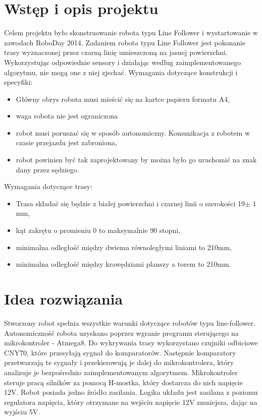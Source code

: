 \documentclass[11pt,a4paper]{article}
\begin{document}
\section{Wstęp i opis projektu}
Celem projektu było skonstruowanie robota typu Line Follower i wystartowanie w zawodach RoboDay 2014.
Zadaniem robota typu Line Follower jest pokonanie trasy wyznaczonej przez czarną linię umieszczoną na jasnej powierzchni. Wykorzystując odpowiednie sensory i działając według zaimplementowanego algorytmu, nie mogą one z niej zjechać.
\newline Wymagania dotyczące konstrukcji i specyfiki:
\begin{itemize}
  \item Główny obrys robota musi mieścić się na kartce papieru formatu A4,
  \item waga robota nie jest ograniczona
  \item robot musi poruszać się w sposób autonomiczny. Komunikacja z robotem w czasie przejazdu jest zabroniona,
  \item robot powinien być tak zaprojektowany by można było go uruchomić na znak dany przez sędziego.
\end{itemize}
Wymagania dotyczące trasy:
\begin{itemize}
  \item Trasa składać się będzie z białej powierzchni i czarnej linii o szerokości 19$\pm$ 1 mm,
  \item kąt zakrętu o promieniu 0 to maksymalnie 90 stopni,
  \item minimalna odległość między dwiema równoległymi liniami to 210mm,
  \item minimalna odległość między krawędziami planszy a torem to 210mm.
\end{itemize}
\section{Idea rozwiązania}
Stworzony robot spełnia wszystkie warunki dotyczące robotów typu line-follower.
Autonomiczność robota uzyskano poprzez wgranie programu sterującego na mikrokontroler - Atmega8. 
Do wykrywania trasy wykorzystano czujniki odbiciowe CNY70, które przesyłają sygnał do komparatorów.
Następnie komparatory przetwarzają te sygnały i przekierowują je dalej do mikrokontrolera, który analizuje je bezpośrednio zaimplementowanym algorytmem. 
Mikrokontroler steruje pracą silników za pomocą H-mostka, który dostarcza do nich napięcie 12V. Robot posiada jedno źródło zasilania. 
Logika układu jest zasilana z poziomu regulatora napięcia, który otrzymane na wejściu napięcie 12V zmniejsza, dając na wyjściu 5V. 
\end{document}
